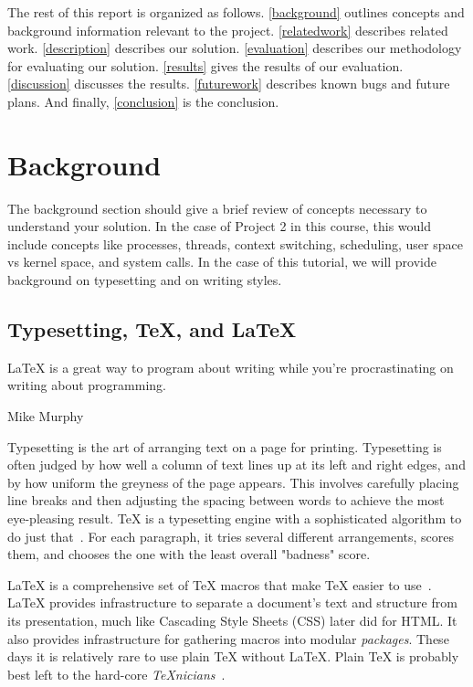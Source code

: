 \documentclass[
	conference,	%
]{IEEEtran}
\newcommand{\newterm}[1]{\textit{#1}}
\newcommand{\TeXnicians}{\TeX\-nicians}
\begin{document}
The rest of this report is organized as follows.
\autoref{background} outlines concepts and background information relevant to the project.
\autoref{relatedwork} describes related work.
\autoref{description} describes our solution.
\autoref{evaluation} describes our methodology for evaluating our solution.
\autoref{results} gives the results of our evaluation.
\autoref{discussion} discusses the results.
\autoref{futurework} describes known bugs and future plans.
And finally, \autoref{conclusion} is the conclusion.


\section{Background}
\label{background}

The background section should give
a brief review of concepts necessary to understand your solution.
In the case of Project 2 in this course, this would include concepts like
processes, threads, context switching, scheduling, user space vs kernel
space, and system calls.
In the case of this tutorial,
we will provide background on typesetting and on writing styles.


\subsection{Typesetting, {\TeX}, and {\LaTeX}}

\epigraph{{\LaTeX} is a great way to program about writing while you're
procrastinating on writing about programming.}{Mike Murphy}

Typesetting is the art of arranging text on a page for printing.
Typesetting is often judged by how well a column of text lines up at its
left and right edges,
and by how uniform the greyness of the page appears.
This involves carefully placing line breaks
and then adjusting the spacing between words
to achieve the most eye-pleasing result.
{\TeX} is a typesetting engine with a sophisticated algorithm
to do just that~\cite{Knuth1986Texbook}.
For each paragraph, it tries several different arrangements, scores them,
and chooses the one with the least overall "badness" score.

{\LaTeX} is a comprehensive set of {\TeX} macros
that make {\TeX} easier to use~\cite{Lamport1994LatexBook}.
{\LaTeX} provides infrastructure to separate a document's text and structure
from its presentation,
much like Cascading Style Sheets (CSS) later did for HTML.
It also provides infrastructure for gathering macros into modular
\newterm{packages}.
These days it is relatively rare to use plain {\TeX} without {\LaTeX}.
Plain {\TeX} is probably best left to the hard-core
\newterm{\TeXnicians}~\cite{Knuth1986Texbook}.\footnotemark
\end{document}
